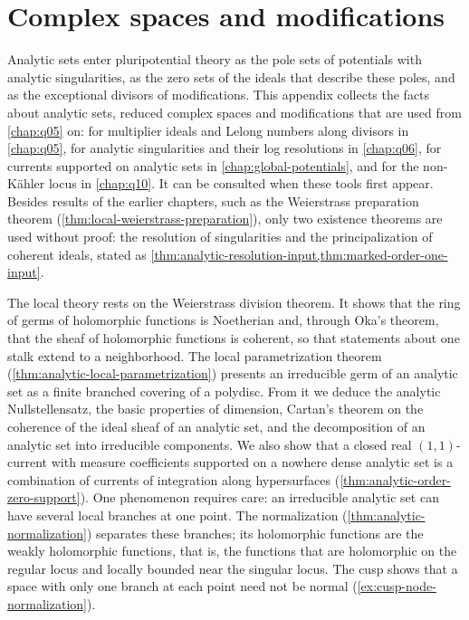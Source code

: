 \chapter{Complex spaces and modifications}
\label{chap:a01}

Analytic sets enter pluripotential theory as the pole sets of potentials with analytic singularities, as the zero sets of the ideals that describe these poles, and as the exceptional divisors of modifications. This appendix collects the facts about analytic sets, reduced complex spaces and modifications that are used from \cref{chap:q05} on: for multiplier ideals and Lelong numbers along divisors in \cref{chap:q05}, for analytic singularities and their log resolutions in \cref{chap:q06}, for currents supported on analytic sets in \cref{chap:global-potentials}, and for the non-K\"ahler locus in \cref{chap:q10}. It can be consulted when these tools first appear. Besides results of the earlier chapters, such as the Weierstrass preparation theorem (\cref{thm:local-weierstrass-preparation}), only two existence theorems are used without proof: the resolution of singularities and the principalization of coherent ideals, stated as \cref{thm:analytic-resolution-input,thm:marked-order-one-input}.

The local theory rests on the Weierstrass division theorem. It shows that the ring of germs of holomorphic functions is Noetherian and, through Oka's theorem, that the sheaf of holomorphic functions is coherent, so that statements about one stalk extend to a neighborhood. The local parametrization theorem (\cref{thm:analytic-local-parametrization}) presents an irreducible germ of an analytic set as a finite branched covering of a polydisc. From it we deduce the analytic Nullstellensatz, the basic properties of dimension, Cartan's theorem on the coherence of the ideal sheaf of an analytic set, and the decomposition of an analytic set into irreducible components. We also show that a closed real $(1,1)$-current with measure coefficients supported on a nowhere dense analytic set is a combination of currents of integration along hypersurfaces (\cref{thm:analytic-order-zero-support}). One phenomenon requires care: an irreducible analytic set can have several local branches at one point. The normalization (\cref{thm:analytic-normalization}) separates these branches; its holomorphic functions are the weakly holomorphic functions, that is, the functions that are holomorphic on the regular locus and locally bounded near the singular locus. The cusp shows that a space with only one branch at each point need not be normal (\cref{ex:cusp-node-normalization}).

